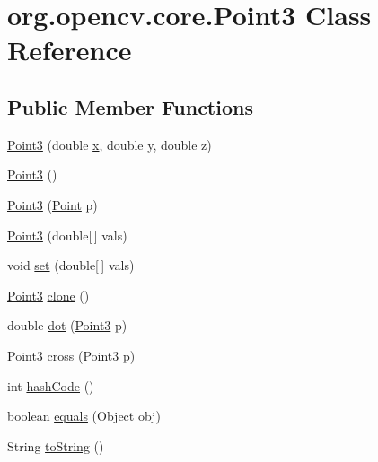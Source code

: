 \hypertarget{classorg_1_1opencv_1_1core_1_1_point3}{}\section{org.\+opencv.\+core.\+Point3 Class Reference}
\label{classorg_1_1opencv_1_1core_1_1_point3}
\subsection*{Public Member Functions}
\begin{DoxyCompactItemize}
\item 
\mbox{\hyperlink{classorg_1_1opencv_1_1core_1_1_point3_ae57de7c64ddb712748d49f7314b59219}{Point3}} (double \mbox{\hyperlink{classorg_1_1opencv_1_1core_1_1_point3_a0f6ddd298923e45df4b250ef1c97c270}{x}}, double y, double z)
\item 
\mbox{\hyperlink{classorg_1_1opencv_1_1core_1_1_point3_a1df984d9d2d8a01c30867c360e39fbc7}{Point3}} ()
\item 
\mbox{\hyperlink{classorg_1_1opencv_1_1core_1_1_point3_a3de02bfb7c1ec68bb449719c6013c4d1}{Point3}} (\mbox{\hyperlink{classorg_1_1opencv_1_1core_1_1_point}{Point}} p)
\item 
\mbox{\hyperlink{classorg_1_1opencv_1_1core_1_1_point3_a93d79d65734ef3a9cf9e807fe796ad99}{Point3}} (double\mbox{[}$\,$\mbox{]} vals)
\item 
void \mbox{\hyperlink{classorg_1_1opencv_1_1core_1_1_point3_af2e7834d731c39649945d569c720c00d}{set}} (double\mbox{[}$\,$\mbox{]} vals)
\item 
\mbox{\hyperlink{classorg_1_1opencv_1_1core_1_1_point3}{Point3}} \mbox{\hyperlink{classorg_1_1opencv_1_1core_1_1_point3_a404fb453332aad5afb445c648a016ddd}{clone}} ()
\item 
double \mbox{\hyperlink{classorg_1_1opencv_1_1core_1_1_point3_a5a0448003928e22db5862037f26207e8}{dot}} (\mbox{\hyperlink{classorg_1_1opencv_1_1core_1_1_point3}{Point3}} p)
\item 
\mbox{\hyperlink{classorg_1_1opencv_1_1core_1_1_point3}{Point3}} \mbox{\hyperlink{classorg_1_1opencv_1_1core_1_1_point3_a20def3867d163176e98d49a97bb5e3f2}{cross}} (\mbox{\hyperlink{classorg_1_1opencv_1_1core_1_1_point3}{Point3}} p)
\item 
int \mbox{\hyperlink{classorg_1_1opencv_1_1core_1_1_point3_a08347311270e767b198ec19b4aae2444}{hash\+Code}} ()
\item 
boolean \mbox{\hyperlink{classorg_1_1opencv_1_1core_1_1_point3_afd19df6008c557cd287086ac4214beb8}{equals}} (Object obj)
\item 
String \mbox{\hyperlink{classorg_1_1opencv_1_1core_1_1_point3_a009debefdc9246adf04a2c1f4a3dd2f4}{to\+String}} ()
\end{DoxyCompactItemize}
